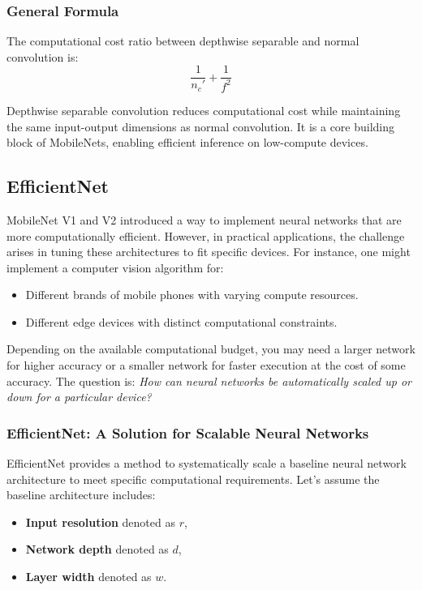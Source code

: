 \documentclass[letterpaper,12pt,notitlepage,twoside]{report}
\begin{document}
\subsubsection*{General Formula}
The computational cost ratio between depthwise separable and normal convolution is:
\[
\frac{1}{n_c'} + \frac{1}{f^2}
\]

Depthwise separable convolution reduces computational cost while maintaining the same input-output dimensions as normal convolution. It is a core building block of MobileNets, enabling efficient inference on low-compute devices.


\subsection*{EfficientNet}
MobileNet V1 and V2 introduced a way to implement neural networks that are more computationally efficient. However, in practical applications, the challenge arises in tuning these architectures to fit specific devices. For instance, one might implement a computer vision algorithm for:
\begin{itemize}[nosep]
    \item Different brands of mobile phones with varying compute resources.
    \item Different edge devices with distinct computational constraints.
\end{itemize}

Depending on the available computational budget, you may need a larger network for higher accuracy or a smaller network for faster execution at the cost of some accuracy. The question is: \textit{How can neural networks be automatically scaled up or down for a particular device?}

\subsubsection*{EfficientNet: A Solution for Scalable Neural Networks}
EfficientNet provides a method to systematically scale a baseline neural network architecture to meet specific computational requirements. Let’s assume the baseline architecture includes:
\begin{itemize}[nosep]
    \item \textbf{Input resolution} denoted as \(r\),
    \item \textbf{Network depth} denoted as \(d\),
    \item \textbf{Layer width} denoted as \(w\).
\end{itemize}
\end{document}
